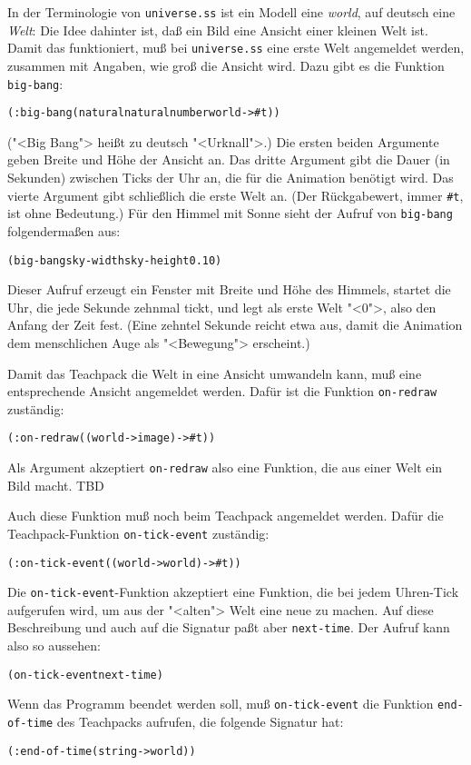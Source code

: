 In der Terminologie von \texttt{universe.ss} ist ein Modell eine
\textit{world}, auf deutsch eine \textit{Welt}: Die Idee dahinter
ist, daß ein Bild eine Ansicht einer kleinen Welt ist.  Damit das
funktioniert, muß bei \texttt{universe.ss} eine erste Welt angemeldet
werden, zusammen mit Angaben, wie groß die Ansicht wird.  Dazu gibt es
die Funktion \texttt{big-bang}:
%
\begin{alltt}
(: big-bang (natural natural number world -> #t))
\end{alltt}
%
("<Big Bang"> heißt zu deutsch "<Urknall">.)
Die ersten beiden Argumente geben Breite und Höhe der Ansicht an.  Das
dritte Argument gibt die Dauer (in Sekunden) zwischen Ticks der Uhr
an, die für die Animation benötigt wird.  Das vierte Argument gibt
schließlich die erste Welt an.  (Der Rückgabewert, immer
\verb|#t|, ist ohne Bedeutung.)  Für den Himmel mit
Sonne sieht der Aufruf von \texttt{big-bang} folgendermaßen aus:
%
\begin{alltt}
(big-bang sky-width sky-height 0.1 0)
\end{alltt}
%
Dieser Aufruf erzeugt ein Fenster mit Breite und Höhe des Himmels,
startet die Uhr, die jede Sekunde zehnmal tickt, und legt als erste
Welt "<0">, also den Anfang der Zeit fest.  (Eine zehntel Sekunde
reicht etwa aus, damit die Animation dem menschlichen Auge als
"<Bewegung"> erscheint.)

Damit das Teachpack die Welt in eine Ansicht umwandeln kann, muß eine
entsprechende Ansicht angemeldet werden.  Dafür ist die Funktion
\texttt{on-redraw} zuständig:
%
\begin{alltt}
(: on-redraw ((world -> image) -> #t))
\end{alltt}
%
Als Argument akzeptiert \texttt{on-redraw} also eine Funktion, die aus
einer Welt ein Bild macht.  TBD

Auch diese Funktion muß noch beim Teachpack angemeldet werden.  Dafür
die Teachpack-Funktion
\texttt{on-tick-event}
zuständig:
%
\begin{alltt}
(: on-tick-event ((world -> world) -> #t))
\end{alltt}
%
Die \texttt{on-tick-event}-Funktion akzeptiert eine Funktion, die bei
jedem Uhren-Tick aufgerufen wird, um aus der "<alten"> Welt eine neue
zu machen.  Auf diese Beschreibung und auch auf die Signatur
paßt aber \texttt{next-time}.  Der Aufruf kann also so aussehen:
%
\begin{alltt}
(on-tick-event next-time)
\end{alltt}
%
Wenn das Programm
beendet werden soll, muß \texttt{on-tick-event} die Funktion
\texttt{end-of-time} des
Teachpacks aufrufen, die folgende Signatur hat:
%
\begin{alltt}
(: end-of-time (string -> world))
\end{alltt}
%

